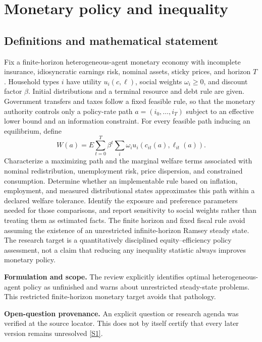 \documentclass[11pt]{article}
\newcommand{\sref}[2]{\hyperlink{source:#1:#2}{[S#2]}}
\begin{document}
\section*{Monetary policy and inequality}\label{30007530}
\subsection{Definitions and mathematical statement}
Fix a finite-horizon heterogeneous-agent monetary economy with incomplete insurance, idiosyncratic earnings risk, nominal assets, sticky prices, and horizon \(T\). Household types \(i\) have utility \(u_i(c,\ell)\), social weights \(\omega_i\ge0\), and discount factor \(\beta\). Initial distributions and a terminal resource and debt rule are given. Government transfers and taxes follow a fixed feasible rule, so that the monetary authority controls only a policy-rate path \(a=(i_0,\ldots,i_T)\) subject to an effective lower bound and an information constraint.
For every feasible path inducing an equilibrium, define
\[
W(a)=E\sum_{t=0}^T\beta^t\sum_i\omega_i u_i(c_{it}(a),\ell_{it}(a)).
\]
Characterize a maximizing path and the marginal welfare terms associated with nominal redistribution, unemployment risk, price dispersion, and constrained consumption. Determine whether an implementable rule based on inflation, employment, and measured distributional states approximates this path within a declared welfare tolerance. Identify the exposure and preference parameters needed for those comparisons, and report sensitivity to social weights rather than treating them as estimated facts. The finite horizon and fixed fiscal rule avoid assuming the existence of an unrestricted infinite-horizon Ramsey steady state. The research target is a quantitatively disciplined equity–efficiency policy assessment, not a claim that reducing any inequality statistic always improves monetary policy.

\par\textbf{Formulation and scope.} The review explicitly identifies optimal heterogeneous-agent policy as unfinished and warns about unrestricted steady-state problems. This restricted finite-horizon monetary target avoids that pathology.

\par\textbf{Open-question provenance.} An explicit question or research agenda was verified at the source locator. This does not by itself certify that every later version remains unresolved \sref{30007530}{1}.
\end{document}

